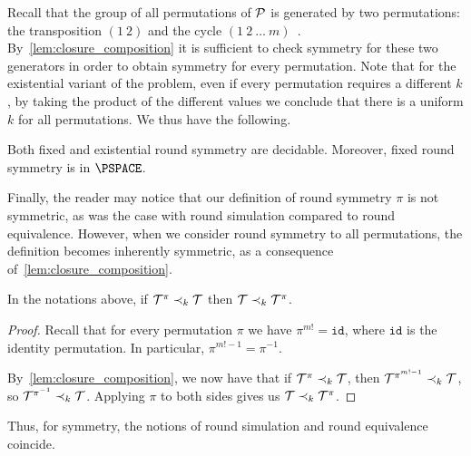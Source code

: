 Recall that the group of all permutations of $\mathcal{P}$ is generated by two permutations: the transposition $(1\ 2)$ and the cycle $(1\ 2\ \ldots\ m)$~\cite{Cameron1999}. By~\cref{lem:closure_composition} it is sufficient to check symmetry for these two generators in order to obtain symmetry for every permutation. Note that for the existential variant of the problem, even if every permutation requires a different $k$, by taking the product of the different values we conclude that there is a uniform $k$ for all permutations.
We thus have the following.
\begin{theorem}
\label{thm:symmetry_decidable}
Both fixed and existential round symmetry are decidable. Moreover, fixed round symmetry is in $\PSPACE$.
\end{theorem}

Finally, the reader may notice that our definition of round symmetry \WRT $\pi$ is not symmetric, as was the case with round simulation compared to round equivalence. However, when we consider round symmetry \WRT to all permutations, the definition becomes inherently symmetric, as a consequence of~\cref{lem:closure_composition}.
\begin{lemma}
\label{lem:round_symmetry_commutative}
    In the notations above, if $\mathcal{T}^{\pi}\prec_k \mathcal{T}$ then $\mathcal{T}\prec_k \mathcal{T}^\pi$.
\end{lemma}
\begin{proof}
    Recall that for every permutation $\pi$ we have $\pi^{m!}=\mathtt{id}$, where $\mathtt{id}$ is the identity permutation. In particular, $\pi^{m!-1}=\pi^{-1}$. 

    By~\cref{lem:closure_composition}, we now have that if $\mathcal{T}^{\pi}\prec_k \mathcal{T}$, then $\mathcal{T}^{\pi^{m!-1}}\prec_k \mathcal{T}$, so $\mathcal{T}^{\pi^{-1}}\prec_k \mathcal{T}$. Applying $\pi$ to both sides gives us $\mathcal{T}\prec_k \mathcal{T}^{\pi}$.
\end{proof}

Thus, for symmetry, the notions of round simulation and round equivalence coincide.
